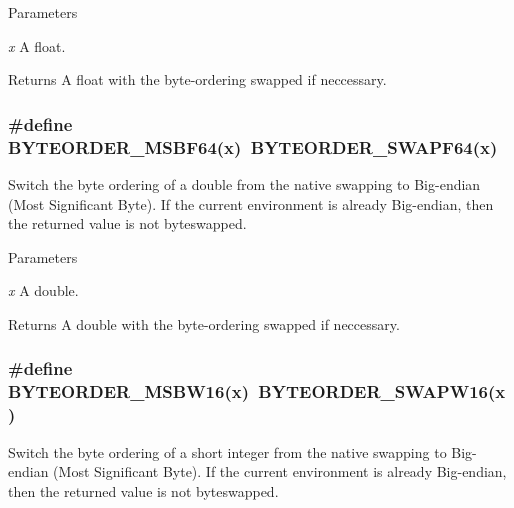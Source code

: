 \begin{DoxyParams}{Parameters}
\item[{\em x}]A float. \end{DoxyParams}
\begin{DoxyReturn}{Returns}
A float with the byte-\/ordering swapped if neccessary. 
\end{DoxyReturn}
\hypertarget{group__byteorder_ga5b3d8dac5e677fd03f1959a2ff68784e}{
\subsubsection[{BYTEORDER\_\-MSBF64}]{\setlength{\rightskip}{0pt plus 5cm}\#define BYTEORDER\_\-MSBF64(x)~BYTEORDER\_\-SWAPF64(x)}}
\label{group__byteorder_ga5b3d8dac5e677fd03f1959a2ff68784e}


Switch the byte ordering of a double from the native swapping to Big-\/endian (Most Significant Byte). If the current environment is already Big-\/endian, then the returned value is not byteswapped.


\begin{DoxyParams}{Parameters}
\item[{\em x}]A double. \end{DoxyParams}
\begin{DoxyReturn}{Returns}
A double with the byte-\/ordering swapped if neccessary. 
\end{DoxyReturn}
\hypertarget{group__byteorder_gaa99b101c1a15ccb9bf5d070aea1b23c8}{
\subsubsection[{BYTEORDER\_\-MSBW16}]{\setlength{\rightskip}{0pt plus 5cm}\#define BYTEORDER\_\-MSBW16(x)~BYTEORDER\_\-SWAPW16(x)}}
\label{group__byteorder_gaa99b101c1a15ccb9bf5d070aea1b23c8}


Switch the byte ordering of a short integer from the native swapping to Big-\/endian (Most Significant Byte). If the current environment is already Big-\/endian, then the returned value is not byteswapped.


